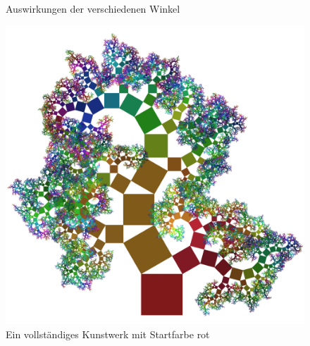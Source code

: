 \begin{figure}[ht]
\\
\caption{Auswirkungen der verschiedenen Winkel}
\end{figure}
\begin{figure}[ht]
 \centering
 \includegraphics[width=0.72\textheight, height=0.72\textheight]{art.png}
 \caption{Ein vollständiges Kunstwerk mit Startfarbe rot}
\end{figure}
